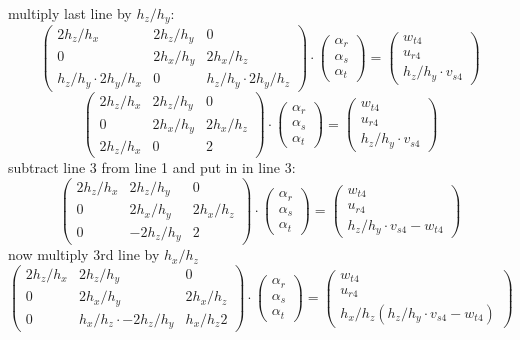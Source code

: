 multiply last line by $h_z/h_y$:
\[
\left(
\begin{array}{ccc}
2h_z/h_x & 2h_z/h_y & 0 \\
0        & 2h_x/h_y & 2h_x/h_z \\
h_z/h_y \cdot 2h_y/h_x & 0        & h_z/h_y \cdot 2h_y/h_z
\end{array}
\right)
\cdot
\left(
\begin{array}{c}
\alpha_r \\ \alpha_s \\ \alpha_t
\end{array}
\right)
=
\left(
\begin{array}{c}
w_{t4} \\
u_{r4} \\
h_z/h_y \cdot v_{s4} 
\end{array}
\right)
\]
\[
\left(
\begin{array}{ccc}
2h_z/h_x & 2h_z/h_y & 0 \\
0        & 2h_x/h_y & 2h_x/h_z \\
2h_z/h_x & 0        & 2 
\end{array}
\right)
\cdot
\left(
\begin{array}{c}
\alpha_r \\ \alpha_s \\ \alpha_t
\end{array}
\right)
=
\left(
\begin{array}{c}
w_{t4} \\
u_{r4} \\
h_z/h_y \cdot v_{s4} 
\end{array}
\right)
\]
subtract line 3 from line 1 and put in in line 3:
\[
\left(
\begin{array}{ccc}
2h_z/h_x & 2h_z/h_y & 0 \\
0        & 2h_x/h_y & 2h_x/h_z \\
0        & -2h_z/h_y & 2
\end{array}
\right)
\cdot
\left(
\begin{array}{c}
\alpha_r \\ \alpha_s \\ \alpha_t
\end{array}
\right)
=
\left(
\begin{array}{c}
w_{t4} \\
u_{r4} \\
h_z/h_y \cdot v_{s4} - w_{t4}
\end{array}
\right)
\]
now multiply 3rd line by $h_x/h_z$
\[
\left(
\begin{array}{ccc}
2h_z/h_x & 2h_z/h_y & 0 \\
0        & 2h_x/h_y & 2h_x/h_z \\
0        &h_x/h_z \cdot -2h_z/h_y & h_x/h_z 2
\end{array}
\right)
\cdot
\left(
\begin{array}{c}
\alpha_r \\ \alpha_s \\ \alpha_t
\end{array}
\right)
=
\left(
\begin{array}{c}
w_{t4} \\
u_{r4} \\
h_x/h_z (h_z/h_y \cdot v_{s4} - w_{t4})
\end{array}
\right)
\]
